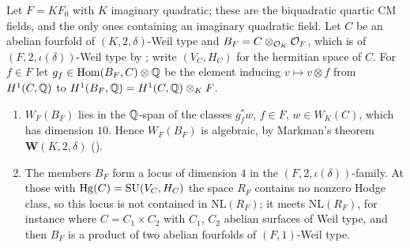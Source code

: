 \begin{proposition}
\label{prop:quarticscalar}
Let $F=KF_{0}$ with $K$ imaginary quadratic; these are the biquadratic
quartic CM fields, and the only ones containing an imaginary quadratic field.
Let $C$ be an abelian fourfold of $(K,2,\delta)$-Weil type and
$B_{F}=C\otimes_{\mathcal{O}_{K}}\mathcal{O}_{F}$, which is of $(F,2,\iota(\delta))$-Weil type by
\cite[Proposition~2.13(ii)]{paperIII}; write $(V_{C},H_{C})$ for the hermitian space of $C$.
For $f\in F$ let $g_{f}\in\operatorname{Hom}(B_{F},C)\otimes\mathbb{Q}$ be the element inducing
$v\mapsto v\otimes f$ from $H^{1}(C,\mathbb{Q})$ to
$H^{1}(B_{F},\mathbb{Q})=H^{1}(C,\mathbb{Q})\otimes_{K}F$.
\begin{enumerate}[label=\textup{(\roman*)},leftmargin=2.6em,itemsep=2pt]
\item $W_{F}(B_{F})$ lies in the $\mathbb{Q}$-span of the classes $g_{f}^{*}w$, $f\in F$,
  $w\in W_{K}(C)$, which has dimension $10$. Hence $W_{F}(B_{F})$ is
  algebraic, by Markman's theorem $\mathbf{W}(K,2,\delta)$ \cite{Mar25a}
  (\cite[Proposition~2.12(ii)]{paperIII}).
\item The members $B_{F}$ form a locus of dimension $4$ in the
  $(F,2,\iota(\delta))$-family. At those with $\operatorname{Hg}(C)=\operatorname{SU}(V_{C},H_{C})$ the
  space $R_{F}$ contains no nonzero Hodge class, so
  this locus is not contained in $\mathrm{NL}(R_{F})$; it meets
  $\mathrm{NL}(R_{F})$, for instance where $C=C_{1}\times C_{2}$ with $C_{1}$,
  $C_{2}$ abelian surfaces of Weil type, and then $B_{F}$ is a product of two
  abelian fourfolds of $(F,1)$-Weil type.
\end{enumerate}
\end{proposition}

